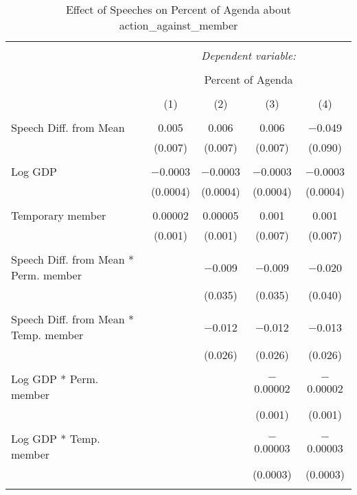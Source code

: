 
\begin{table}[!htbp] \centering 
  \caption{Effect of Speeches on Percent of Agenda about action_against_member} 
  \label{} 
\begin{tabular}{@{\extracolsep{5pt}}lcccc} 
\\[-1.8ex]\hline 
\hline \\[-1.8ex] 
 & \multicolumn{4}{c}{\textit{Dependent variable:}} \\ 
\cline{2-5} 
\\[-1.8ex] & \multicolumn{4}{c}{Percent of Agenda} \\ 
\\[-1.8ex] & (1) & (2) & (3) & (4)\\ 
\hline \\[-1.8ex] 
 Speech Diff. from Mean & 0.005 & 0.006 & 0.006 & $-$0.049 \\ 
  & (0.007) & (0.007) & (0.007) & (0.090) \\ 
  & & & & \\ 
 Log GDP & $-$0.0003 & $-$0.0003 & $-$0.0003 & $-$0.0003 \\ 
  & (0.0004) & (0.0004) & (0.0004) & (0.0004) \\ 
  & & & & \\ 
 Temporary member & 0.00002 & 0.00005 & 0.001 & 0.001 \\ 
  & (0.001) & (0.001) & (0.007) & (0.007) \\ 
  & & & & \\ 
 Speech Diff. from Mean * Perm. member &  & $-$0.009 & $-$0.009 & $-$0.020 \\ 
  &  & (0.035) & (0.035) & (0.040) \\ 
  & & & & \\ 
 Speech Diff. from Mean * Temp. member &  & $-$0.012 & $-$0.012 & $-$0.013 \\ 
  &  & (0.026) & (0.026) & (0.026) \\ 
  & & & & \\ 
 Log GDP * Perm. member &  &  & $-$0.00002 & $-$0.00002 \\ 
  &  &  & (0.001) & (0.001) \\ 
  & & & & \\ 
 Log GDP * Temp. member &  &  & $-$0.00003 & $-$0.00003 \\ 
  &  &  & (0.0003) & (0.0003) \\ 
  & & & & \\ 

\end{tabular}
\end{table}

